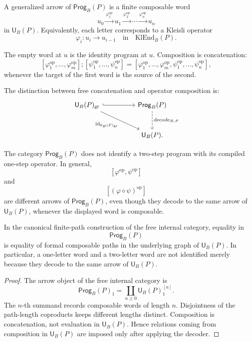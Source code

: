 A generalized arrow of \(\mathsf{Prog}_B(P)\) is a finite composable word
\[
        u_0
        \xrightarrow{\varphi_1^{\operatorname{op}}}
        u_1
        \xrightarrow{\varphi_2^{\operatorname{op}}}
        \cdots
        \xrightarrow{\varphi_n^{\operatorname{op}}}
        u_n
\]
in \(\mathsf U_B(P)\).  Equivalently, each letter corresponds to a Kleisli operator
\[
        \varphi_i:u_i\longrightarrow u_{i-1}
        \quad\text{in}\quad
        \mathrm{KlEnd}_B(P).
\]

The empty word at \(u\) is the identity program at \(u\).  Composition is concatenation:
\[
[\varphi_1^{\operatorname{op}},\ldots,\varphi_m^{\operatorname{op}}]
;
[\psi_1^{\operatorname{op}},\ldots,\psi_n^{\operatorname{op}}]
=
[\varphi_1^{\operatorname{op}},\ldots,\varphi_m^{\operatorname{op}},
  \psi_1^{\operatorname{op}},\ldots,\psi_n^{\operatorname{op}}],
\]
whenever the target of the first word is the source of the second.

The distinction between free concatenation and operator composition is:
\[
\begin{tikzcd}[column sep=huge,row sep=large]
\mathsf U_B(P)_{\mathrm{gr}}
\ar[r,hook]
\ar[dr,swap,"\mathrm{id}_{\mathsf U_B(P)_{\mathrm{gr}}}"]
&
\mathsf{Prog}_B(P)
\ar[d,dashed,"\operatorname{decode}_{B,P}"]
\\
&
\mathsf U_B(P).
\end{tikzcd}
\]

The category \(\mathsf{Prog}_B(P)\) does not identify a two-step program with its compiled one-step
operator.  In general,
\[
        [\varphi^{\operatorname{op}},\psi^{\operatorname{op}}]
\]
and
\[
        [(\varphi\diamond\psi)^{\operatorname{op}}]
\]
are different arrows of \(\mathsf{Prog}_B(P)\), even though they decode to the same arrow of
\(\mathsf U_B(P)\), whenever the displayed word is composable.

\begin{proposition}
\label{prop:intensionality-formal-programs}
In the canonical finite-path construction of the free internal category, equality in
\[
        \mathsf{Prog}_B(P)
\]
is equality of formal composable paths in the underlying graph of \(\mathsf U_B(P)\).  In
particular, a one-letter word and a two-letter word are not identified merely because they decode
to the same arrow of \(\mathsf U_B(P)\).
\end{proposition}

\begin{proof}
The arrow object of the free internal category is
\[
        \mathsf{Prog}_B(P)_1
        =
        \coprod_{n\geq 0}\mathsf U_B(P)_1^{[n]}.
\]
The \(n\)-th summand records composable words of length \(n\).  Disjointness of the path-length
coproducts keeps different lengths distinct.  Composition is concatenation, not evaluation in
\(\mathsf U_B(P)\).  Hence relations coming from composition in \(\mathsf U_B(P)\) are imposed
only after applying the decoder.
\end{proof}

